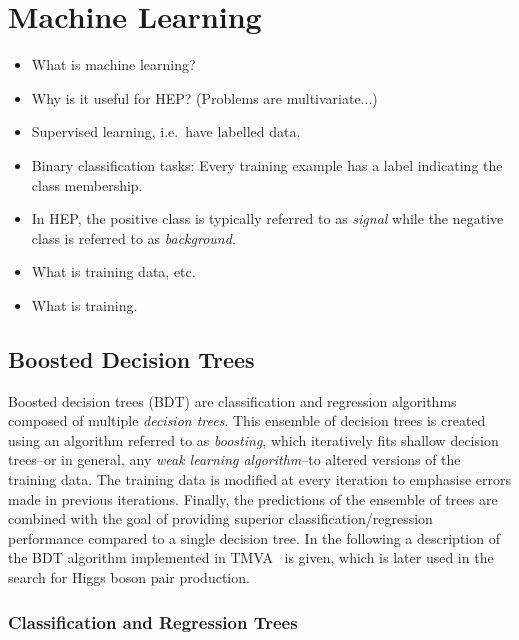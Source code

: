 \section{Machine Learning}

\begin{itemize}
\item What is machine learning?

\item Why is it useful for HEP? (Problems are multivariate...)

\item Supervised learning, i.e.\ have labelled data.

\item Binary classification tasks: Every training example has a label indicating
  the class membership.

\item In HEP, the positive class is typically referred to as \emph{signal} while
  the negative class is referred to as \emph{background}.

\item What is training data, etc.

\item What is training.
\end{itemize}


\subsection{Boosted Decision Trees}

Boosted decision trees (BDT) are classification and regression algorithms
composed of multiple \emph{decision trees}. This ensemble of decision trees is
created using an algorithm referred to as \emph{boosting}, which iteratively
fits shallow decision trees--or in general, any \emph{weak learning
  algorithm}--to altered versions of the training data. The training data is
modified at every iteration to emphasise errors made in previous
iterations. Finally, the predictions of the ensemble of trees are combined with
the goal of providing superior classification/regression performance compared to
a single decision tree. In the following a description of the BDT algorithm
implemented in \textsc{TMVA}~\cite{TMVA} is given, which is later used in the
search for Higgs boson pair production.


\subsubsection{Classification and Regression Trees}

